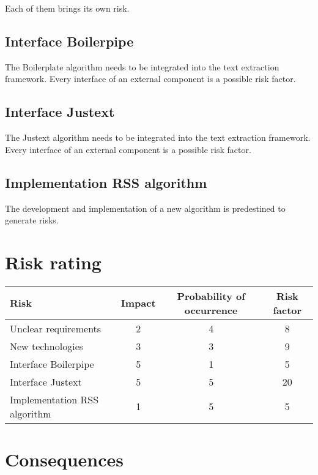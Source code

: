 Each of them brings its own risk.

\subsection{Interface Boilerpipe}

The Boilerplate algorithm needs to be integrated into the text extraction framework. Every interface of an external component is a possible risk factor.

\subsection{Interface Justext}


The Justext algorithm needs to be integrated into the text extraction framework. Every interface of an external component is a possible risk factor.


\subsection{Implementation RSS algorithm}

The development and implementation of a new algorithm is predestined to generate risks.

\section{Risk rating}

\begin{table}[h]
\begin{tabular}{|l|c|c|c|}
\hline
\textbf{Risk} & \textbf{Impact} & \textbf{Probability of occurrence} & \textbf{Risk factor} \\ \hline
Unclear requirements & 2 & 4 & 8\\ \hline
New technologies & 3 & 3 & 9 \\ \hline
Interface Boilerpipe & 5 & 1 & 5\\ \hline
Interface Justext & 5 & 5 & 20 \\ \hline
Implementation RSS algorithm & 1 & 5 & 5\\ \hline
\end{tabular}
\end{table}

\section{Consequences}



